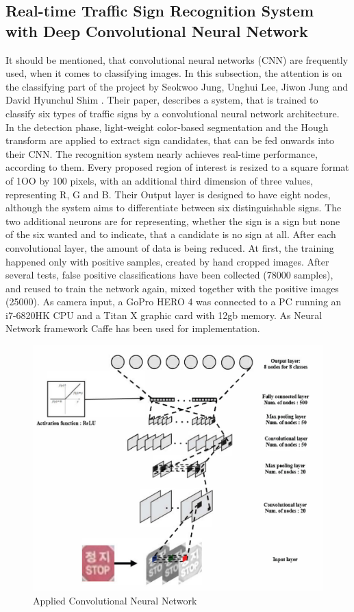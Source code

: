 \subsection{Real-time Traffic Sign Recognition System with Deep Convolutional Neural Network}
It should be mentioned, that convolutional neural networks (CNN) are frequently used, when it comes to classifying images.
In this subsection, the attention is on the classifying part of the project by Seokwoo Jung, Unghui Lee, Jiwon Jung and David Hyunchul Shim \cite{tsrcnn}. 
Their paper, describes a system, that is trained to classify six types of traffic signs by a convolutional
neural network architecture. In the detection phase, light-weight color-based segmentation and the Hough transform  are applied to extract sign candidates, that can be fed onwards into their CNN. The recognition system nearly achieves real-time performance, according to them. \newline
Every proposed region of interest is resized to a square format of 1OO by 100 pixels, with an additional third dimension of three values, representing R, G and B. Their Output layer is designed to have eight nodes, although the system aims to differentiate between six distinguishable signs. The two additional neurons are for representing, whether the sign is a sign but none of the six wanted and to indicate, that a candidate is no sign at all. After each convolutional layer, the amount of data is being reduced.  
At first, the
training happened only with positive samples, created by hand cropped images. After several tests, false positive classifications have been collected (78000 samples), and reused to train the network again, mixed together with the positive images (25000). As camera input, a GoPro HERO 4 was connected to a PC running an i7-6820HK CPU and a Titan X graphic card with 12gb memory. As Neural Network framework Caffe has been used for implementation.

\begin{figure}[H]
	\centering
	\includegraphics[width = 0.8\linewidth]{images/koreancnn.png}
	\caption{Applied Convolutional Neural Network \cite{tsrcnn}}
	\label{fig:koreanNN }
\end{figure}

